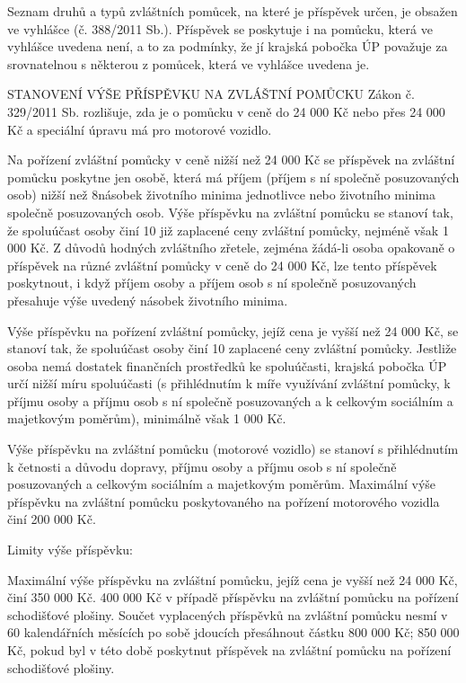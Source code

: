 \documentclass[thesis=M,czech]{FITthesis}[2012/06/26]
\begin{document}
Seznam druhů a typů zvláštních pomůcek, na které je příspěvek určen, je
obsažen ve vyhlášce (č. 388/2011 Sb.). Příspěvek se poskytuje i na pomůcku,
která ve vyhlášce uvedena není, a to za podmínky, že jí krajská pobočka ÚP
považuje za srovnatelnou s některou z pomůcek, která ve vyhlášce uvedena je.

STANOVENÍ VÝŠE PŘÍSPĚVKU NA ZVLÁŠTNÍ POMŮCKU
Zákon č. 329/2011 Sb. rozlišuje, zda je o pomůcku v ceně do 24 000 Kč  nebo
přes 24 000 Kč a speciální úpravu má pro motorové vozidlo.

Na pořízení zvláštní pomůcky v ceně nižší než 24 000 Kč se příspěvek na
zvláštní pomůcku poskytne jen osobě, která má příjem (příjem s ní společně
posuzovaných osob) nižší než 8násobek životního minima jednotlivce nebo
životního minima společně posuzovaných osob. Výše příspěvku na zvláštní
pomůcku se stanoví tak, že spoluúčast osoby činí 10 %
již zaplacené ceny zvláštní pomůcky, nejméně však 1 000 Kč. Z důvodů hodných
zvláštního zřetele, zejména žádá-li osoba opakovaně o příspěvek na různé
zvláštní pomůcky v ceně do 24 000 Kč, lze tento příspěvek poskytnout, i když
příjem osoby a příjem osob s ní společně posuzovaných přesahuje výše uvedený
násobek životního minima.

Výše příspěvku na pořízení zvláštní pomůcky, jejíž cena je vyšší než 24 000
Kč, se stanoví tak, že spoluúčast osoby činí 10 %
zaplacené ceny zvláštní pomůcky. Jestliže osoba nemá dostatek finančních
prostředků ke spoluúčasti, krajská pobočka ÚP určí nižší míru spoluúčasti (s
přihlédnutím k míře využívání zvláštní pomůcky, k příjmu osoby a příjmu osob
s ní společně posuzovaných a k  celkovým sociálním a majetkovým poměrům),
minimálně však 1 000 Kč.

Výše příspěvku na zvláštní pomůcku (motorové vozidlo) se stanoví s
přihlédnutím k četnosti a důvodu dopravy, příjmu osoby a příjmu osob s ní
společně posuzovaných a celkovým sociálním a majetkovým poměrům. Maximální
výše příspěvku na zvláštní pomůcku poskytovaného na pořízení motorového
vozidla činí 200 000 Kč.

Limity výše příspěvku:

    Maximální výše příspěvku na zvláštní pomůcku, jejíž cena je vyšší
než 24 000 Kč, činí 350 000 Kč. 400 000 Kč v případě příspěvku na zvláštní
pomůcku na pořízení schodišťové plošiny.
    Součet vyplacených příspěvků na zvláštní pomůcku nesmí v 60
kalendářních měsících po sobě jdoucích přesáhnout částku 800 000 Kč; 850 000
Kč, pokud byl v této době poskytnut příspěvek na zvláštní pomůcku na
pořízení schodišťové plošiny.
\end{document}

